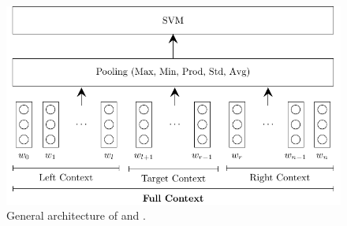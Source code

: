 \begin{figure}[!h]
    \includegraphics{Diagrams/Reproducibility/vo_method.pdf}
    \caption{General architecture of \citet{vo2015target} and \citet{wang-etal-2017-tdparse}.}
    \label{fig:repro_np_architecture}
\end{figure}
\newpage


\FloatBarrier
